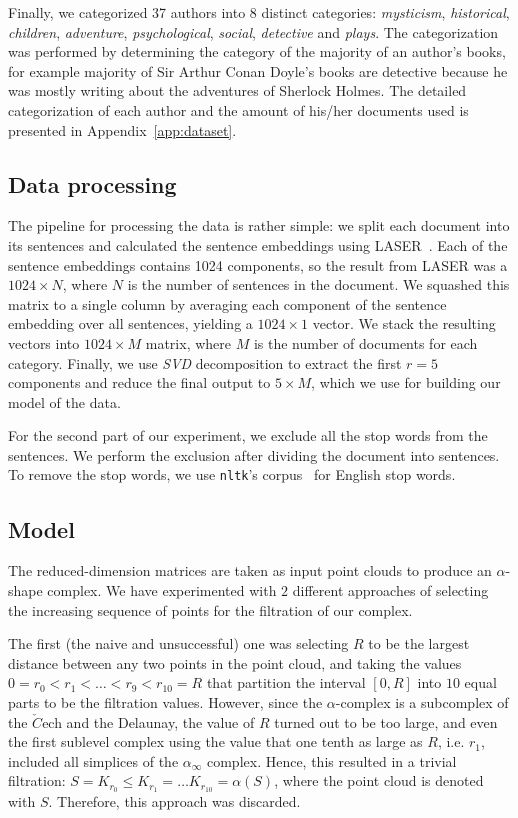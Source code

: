 \documentclass[fleqn]{article}
\begin{document}
	Finally, we categorized 37 authors into 8 distinct categories: \textit{mysticism}, \textit{historical}, \textit{children}, \textit{adventure}, \textit{psychological}, \textit{social}, \textit{detective} and \textit{plays}. The categorization was performed by determining the category of the majority of an author's books, for example majority of Sir Arthur Conan Doyle's books are detective because he was mostly writing about the adventures of Sherlock Holmes. The detailed categorization of each author and the amount of his/her documents used is presented in Appendix~\ref{app:dataset}.
	
	\subsection{Data processing} \label{preprocess}
	The pipeline for processing the data is rather simple: we split each document into its sentences and calculated the sentence embeddings using LASER~\cite{artetxe2018massively}. Each of the sentence embeddings contains 1024 components, so the result from LASER was a $1024\times N$, where $N$ is the number of sentences in the document. We squashed this matrix to a single column by averaging each component of the sentence embedding over all sentences, yielding a $1024\times1$ vector. We stack the resulting vectors into $1024\times M$ matrix, where $M$ is the number of documents for each category. Finally, we use \textit{SVD} decomposition to extract the first $r = 5$ components and reduce the final output to $5 \times M$, which we use for building our model of the data.
	
	For the second part of our experiment, we exclude all the stop words from the sentences. We perform the exclusion after dividing the document into sentences. To remove the stop words, we use \texttt{nltk}'s corpus~\cite{Loper02nltk:the} for English stop words.
	
	\subsection{Model} \label{model}
	The reduced-dimension matrices are taken as input point clouds to produce an $\alpha$-shape complex. We have experimented with $2$ different approaches of selecting the increasing sequence of points for the filtration of our complex.
	
	The first (the naive and unsuccessful) one was selecting $R$ to be the largest distance between any two points in the point cloud, and taking the values $0=r_0 < r_1 < \dots < r_9 < r_{10} = R$ that partition the interval $[0,R]$ into $10$ equal parts to be the filtration values. However, since the $\alpha$-complex is a subcomplex of the $\check{C}$ech and the Delaunay, the value of $R$ turned out to be too large, and even the first sublevel complex using the value that one tenth as large as $R$, i.e. $r_1$, included all simplices of the $\alpha_\infty$ complex. Hence, this resulted in a trivial filtration: $S = K_{r_0} \leq K_{r_1} = \dots K_{r_{10}} = \alpha(S)$, where the point cloud is denoted with $S$. Therefore, this approach was discarded.
	
\end{document}

